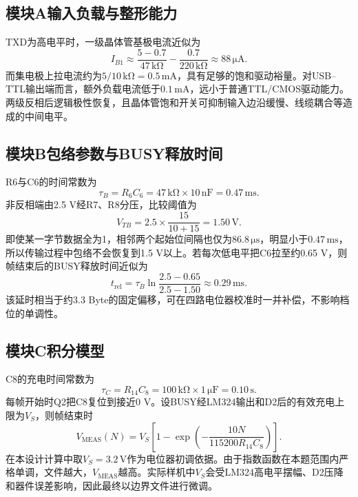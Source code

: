 \documentclass[a4paper]{article}
\newcommand{\unit}[1]{\ensuremath{\,\mathrm{#1}}}
\newcommand{\VMEAS}{V_{\mathrm{MEAS}}}
\begin{document}
\subsection{模块A输入负载与整形能力}
TXD为高电平时，一级晶体管基极电流近似为
\begin{equation}
I_{B1}\approx\frac{5-0.7}{47\unit{k\Omega}}-\frac{0.7}{220\unit{k\Omega}}\approx88\unit{\mu A}.
\end{equation}
而集电极上拉电流约为$5/10\unit{k\Omega}=0.5\unit{mA}$，具有足够的饱和驱动裕量。对USB--TTL输出端而言，额外负载电流低于$0.1\unit{mA}$，远小于普通TTL/CMOS驱动能力。两级反相后逻辑极性恢复，且晶体管饱和开关可抑制输入边沿缓慢、线缆耦合等造成的中间电平。

\subsection{模块B包络参数与BUSY释放时间}
R6与C6的时间常数为
\begin{equation}
\tau_B=R_6C_6=47\unit{k\Omega}\times10\unit{nF}=0.47\unit{ms}.
\end{equation}
非反相端由2.5 V经R7、R8分压，比较阈值为
\begin{equation}
V_{TB}=2.5\times\frac{15}{10+15}=1.50\unit{V}.
\end{equation}
即使某一字节数据全为1，相邻两个起始位间隔也仅为$86.8\unit{\mu s}$，明显小于$0.47\unit{ms}$，所以传输过程中包络不会恢复到1.5 V以上。若每次低电平把C6拉至约0.65 V，则帧结束后的BUSY释放时间近似为
\begin{equation}
 t_{\mathrm{rel}}=\tau_B\ln\frac{2.5-0.65}{2.5-1.50}\approx0.29\unit{ms}.
\end{equation}
该延时相当于约3.3 Byte的固定偏移，可在四路电位器校准时一并补偿，不影响档位的单调性。

\subsection{模块C积分模型}
C8的充电时间常数为
\begin{equation}
\tau_C=R_{14}C_8=100\unit{k\Omega}\times1\unit{\mu F}=0.10\unit{s}.
\end{equation}
每帧开始时Q2把C8复位到接近0 V。设BUSY经LM324输出和D2后的有效充电上限为$V_S$，则帧结束时
\begin{equation}
\VMEAS(N)=V_S\left[1-\exp\left(-\frac{10N}{115200R_{14}C_8}\right)\right].
\label{eq:vmeas}
\end{equation}
在本设计计算中取$V_S=3.2\unit{V}$作为电位器初调依据。由于指数函数在本题范围内严格单调，文件越大，$\VMEAS$越高。实际样机中$V_S$会受LM324高电平摆幅、D2压降和器件误差影响，因此最终以边界文件进行微调。
\end{document}
